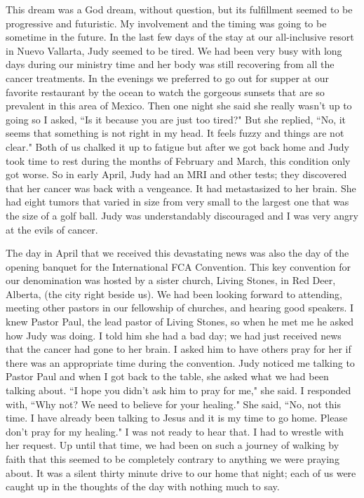 \documentclass[oneside]{book}
\begin{document}
This dream was a God dream, without question, but its fulfillment seemed to be progressive and futuristic. My involvement and the timing was going to be sometime in the future. In the last few days of the stay at our all-inclusive resort in Nuevo Vallarta, Judy seemed to be tired. We had been very busy with long days during our ministry time and her body was still recovering from all the cancer treatments. In the evenings we preferred to go out for supper at our favorite restaurant by the ocean to watch the gorgeous sunsets that are so prevalent in this area of Mexico. Then one night she said she really wasn't up to going so I asked, ``Is it because you are just too tired?" But she replied, ``No, it seems that something is not right in my head. It feels fuzzy and things are not clear." Both of us chalked it up to fatigue but after we got back home and Judy took time to rest during the months of February and March, this condition only got worse. So in early April, Judy had an MRI and other tests; they discovered that her cancer was back with a vengeance. It had metastasized to her brain. She had eight tumors that varied in size from very small to the largest one that was the size of a golf ball. Judy was understandably discouraged and I was very angry at the evils of cancer. 

The day in April that we received this devastating news was also the day of the opening banquet for the International FCA Convention. This key convention for our denomination was hosted by a sister church, Living Stones, in Red Deer, Alberta, (the city right beside us). We had been looking forward to attending, meeting other pastors in our fellowship of churches, and hearing good speakers. I knew Pastor Paul, the lead pastor of Living Stones, so when he met me he asked how Judy was doing. I told him she had a bad day; we had just received news that the cancer had gone to her brain. I asked him to have others pray for her if there was an appropriate time during the convention. Judy noticed me talking to Pastor Paul and when I got back to the table, she asked what we had been talking about. ``I hope you didn't ask him to pray for me," she said. I responded with, ``Why not? We need to believe for your healing." She said, ``No, not this time. I have already been talking to Jesus and it is my time to go home. Please don't pray for my healing." I was not ready to hear that. I had to wrestle with her request. Up until that time, we had been on such a journey of walking by faith that this seemed to be completely contrary to anything we were praying about. It was a silent thirty minute drive to our home that night; each of us were caught up in the thoughts of the day with nothing much to say.
\end{document}
